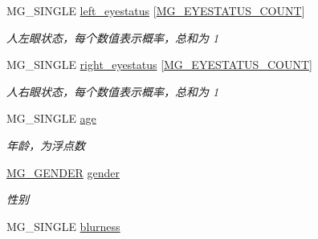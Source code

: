\begin{DoxyCompactItemize}
\mbox{\label{struct_m_g___f_a_c_e_a9f5b81b861b377e823551e0d6d6abc21}} 
M\+G\+\_\+\+S\+I\+N\+G\+LE \hyperlink{struct_m_g___f_a_c_e_a9f5b81b861b377e823551e0d6d6abc21}{left\+\_\+eyestatus} \mbox{[}\hyperlink{_m_g___common_8h_a4aa0d12dd778dc35ae641fae82bba709a9fa5b4b92a7ba2db381a8c319935971c}{M\+G\+\_\+\+E\+Y\+E\+S\+T\+A\+T\+U\+S\+\_\+\+C\+O\+U\+NT}\mbox{]}
\begin{DoxyCompactList}\small\item\em 人左眼状态，每个数值表示概率，总和为 1 \end{DoxyCompactList}\item 
\mbox{\label{struct_m_g___f_a_c_e_a3e138a0223d38abf7584027ad6f1a33b}} 
M\+G\+\_\+\+S\+I\+N\+G\+LE \hyperlink{struct_m_g___f_a_c_e_a3e138a0223d38abf7584027ad6f1a33b}{right\+\_\+eyestatus} \mbox{[}\hyperlink{_m_g___common_8h_a4aa0d12dd778dc35ae641fae82bba709a9fa5b4b92a7ba2db381a8c319935971c}{M\+G\+\_\+\+E\+Y\+E\+S\+T\+A\+T\+U\+S\+\_\+\+C\+O\+U\+NT}\mbox{]}
\begin{DoxyCompactList}\small\item\em 人右眼状态，每个数值表示概率，总和为 1 \end{DoxyCompactList}\item 
\mbox{\label{struct_m_g___f_a_c_e_a3d19097bbf869fd10db78b7e05c7c34d}} 
M\+G\+\_\+\+S\+I\+N\+G\+LE \hyperlink{struct_m_g___f_a_c_e_a3d19097bbf869fd10db78b7e05c7c34d}{age}
\begin{DoxyCompactList}\small\item\em 年龄，为浮点数 \end{DoxyCompactList}\item 
\mbox{\label{struct_m_g___f_a_c_e_a806bfdfc3668813603bee43a6955df99}} 
\hyperlink{struct_m_g___g_e_n_d_e_r}{M\+G\+\_\+\+G\+E\+N\+D\+ER} \hyperlink{struct_m_g___f_a_c_e_a806bfdfc3668813603bee43a6955df99}{gender}
\begin{DoxyCompactList}\small\item\em 性别 \end{DoxyCompactList}\item 
\mbox{\label{struct_m_g___f_a_c_e_a87b32a9b945bb6e710240d6dc23172e9}} 
M\+G\+\_\+\+S\+I\+N\+G\+LE \hyperlink{struct_m_g___f_a_c_e_a87b32a9b945bb6e710240d6dc23172e9}{blurness}

\end{DoxyCompactItemize}
